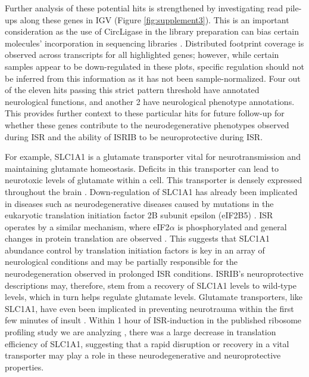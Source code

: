 \documentclass[10pt, oneside]{article}
\begin{document}
Further analysis of these potential hits is strengthened by investigating read pile-ups along these genes in IGV \cite{igv} (Figure \ref{fig:supplement3}). This is an important consideration as the use of CircLigase in the library preparation can bias certain molecules' incorporation in sequencing libraries \cite{circligase_bias}. Distributed footprint coverage is observed across transcripts for all highlighted genes; however, while certain samples appear to be down-regulated in these plots, specific regulation should not be inferred from this information as it has not been sample-normalized. Four out of the eleven hits passing this strict pattern threshold have annotated neurological functions, and another 2 have neurological phenotype annotations. This provides further context to these particular hits for future follow-up for whether these genes contribute to the neurodegenerative phenotypes observed during ISR and the ability of ISRIB to be neuroprotective during ISR.

For example, SLC1A1 is a glutamate transporter vital for neurotransmission and maintaining glutamate homeostasis. Deficits in this transporter can lead to neurotoxic levels of glutamate within a cell. This transporter is densely expressed throughout the brain \cite{slc1a1_neurotoxic}. Down-regulation of SLC1A1 has already been implicated in diseases such as neurodegenerative diseases caused by mutations in the eukaryotic translation initiation factor 2B subunit epsilon (eIF2B5) \cite{eif2b_neuroprotective}. ISR operates by a similar mechanism, where eIF2$\alpha$ is phosphorylated and general changes in protein translation are observed \cite{isrib_riboseq, isrib_structure}. This suggests that SLC1A1 abundance control by translation initiation factors is key in an array of neurological conditions and may be partially responsible for the neurodegeneration observed in prolonged ISR conditions. ISRIB's neuroprotective descriptions may, therefore, stem from a recovery of SLC1A1 levels to wild-type levels, which in turn helps regulate glutamate levels. Glutamate transporters, like SLC1A1, have even been implicated in preventing neurotrauma within the first few minutes of insult \cite{slc1a1_neurotoxic}. Within 1 hour of ISR-induction in the published ribosome profiling study we are analyzing \cite{isrib_riboseq}, there was a large decrease in translation efficiency of SLC1A1, suggesting that a rapid disruption or recovery in a vital transporter may play a role in these neurodegenerative and neuroprotective properties.
\end{document}
